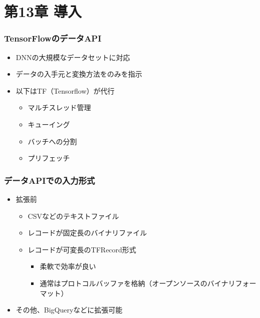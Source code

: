\hypertarget{ux7b2c13ux7ae0-ux5c0eux5165}{%
\section{第13章 導入}\label{ux7b2c13ux7ae0-ux5c0eux5165}}

\hypertarget{tensorflowux306eux30c7ux30fcux30bfapi}{%
\subsubsection{TensorFlowのデータAPI}\label{tensorflowux306eux30c7ux30fcux30bfapi}}

\begin{itemize}
\tightlist
\item
  DNNの大規模なデータセットに対応
\item
  データの入手元と変換方法をのみを指示
\item
  以下はTF（Tensorflow）が代行

  \begin{itemize}
  \tightlist
  \item
    マルチスレッド管理
  \item
    キューイング
  \item
    バッチへの分割
  \item
    プリフェッチ
  \end{itemize}
\end{itemize}

\hypertarget{ux30c7ux30fcux30bfapiux3067ux306eux5165ux529bux5f62ux5f0f}{%
\subsubsection{データAPIでの入力形式}\label{ux30c7ux30fcux30bfapiux3067ux306eux5165ux529bux5f62ux5f0f}}

\begin{itemize}
\tightlist
\item
  拡張前

  \begin{itemize}
  \tightlist
  \item
    CSVなどのテキストファイル
  \item
    レコードが固定長のバイナリファイル
  \item
    レコードが可変長のTFRecord形式

    \begin{itemize}
    \tightlist
    \item
      柔軟で効率が良い
    \item
      通常はプロトコルバッファを格納（オープンソースのバイナリフォーマット）
    \end{itemize}
  \end{itemize}
\item
  その他、BigQueryなどに拡張可能
\end{itemize}

